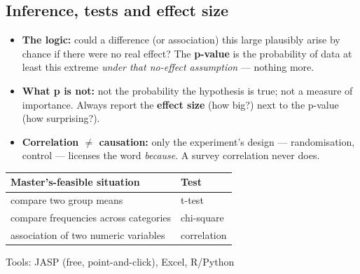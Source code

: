 \documentclass[11pt,a4paper,british,twoside=false,headings=small,chapterprefix=false,numbers=noenddot]{scrbook}
\begin{document}
\subsection{Inference, tests and effect size}
\begin{center}\small
\small
  \begin{itemize}\setlength{\itemsep}{0.4em}
    \item \textbf{The logic:} could a difference (or association) this large
          plausibly arise by chance if there were no real effect? The
          \textbf{p-value} is the probability of data at least this extreme
          \emph{under that no-effect assumption} --- nothing more.
    \item \textbf{What p is not:} not the probability the hypothesis is
          true; not a measure of importance. Always report the \textbf{effect
          size} (how big?) next to the p-value (how surprising?).
    \item \textbf{Correlation $\neq$ causation:} only the experiment's
          design --- randomisation, control --- licenses the word
          \emph{because}. A survey correlation never does.
  \end{itemize}
  
  \renewcommand{\arraystretch}{1.25}
  \begin{tabular}{@{}p{5.6cm}p{3.4cm}@{}}
    \toprule
    \textbf{Master's-feasible situation} & \textbf{Test}\\
    \midrule
    compare two group means & t-test\\
    compare frequencies across categories & chi-square\\
    association of two numeric variables & correlation\\
    \bottomrule
  \end{tabular}
  \hfill {\color{kgrey}\scriptsize Tools: JASP (free, point-and-click), Excel, R/Python}
\end{center}
\end{document}
